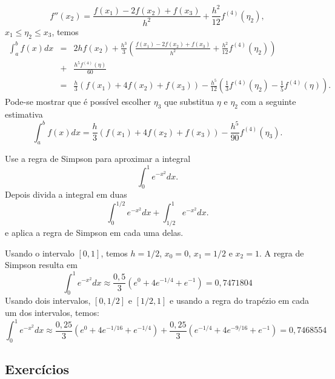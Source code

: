 $$
f''(x_2)=\frac{f(x_1)-2f(x_2)+f(x_3)}{h^2}+\frac{h^2}{12}f^{(4)}(\eta_2),
$$
$x_1\leq \eta_2\leq x_3$, temos
\begin{eqnarray*}
\int_a^bf(x)dx&=&2hf(x_2)+\frac{h^3}{3}\left(\frac{f(x_1)-2f(x_2)+f(x_3)}{h^2}+\frac{h^2}{12}f^{(4)}(\eta_2)\right)\\
&+&\frac{h^5f^{(4)}(\eta)}{60}\\
&=&\frac{h}{3}\left(f(x_1)+4f(x_2)+f(x_3)\right)-\frac{h^5}{12}\left(\frac{1}{3}f^{(4)}(\eta_2)-\frac{1}{5}f^{(4)}(\eta)\right).
\end{eqnarray*}
Pode-se mostrar que é possível escolher $\eta_3$ que substitua $\eta$ e $\eta_2$ com a seguinte estimativa
$$
\int_a^bf(x)dx=\frac{h}{3}\left(f(x_1)+4f(x_2)+f(x_3)\right)-\frac{h^5}{90}f^{(4)}(\eta_3).
$$

\begin{ex}
Use a regra de Simpson para aproximar a integral
$$
\int_0^1e^{-x^2}dx.
$$
Depois divida a integral em duas
$$
\int_0^{1/2}e^{-x^2}dx+\int_{1/2}^{1}e^{-x^2}dx.
$$
e aplica a regra de Simpson em cada uma delas.
\end{ex}
Usando o intervalo $[0,1]$, temos $h=1/2$, $x_0=0$, $x_1=1/2$ e $x_2=1$. A regra de Simpson resulta em
$$
\int_0^1e^{-x^2}dx\approx \frac{0,5}{3}(e^{0}+4e^{-1/4}+e^{-1})=0,7471804
$$
Usando dois intervalos, $[0,1/2]$ e $[1/2,1]$ e usando a regra do trapézio em cada um dos intervalos, temos:
$$
\int_0^1e^{-x^2}dx\approx \frac{0,25}{3}(e^{0}+4e^{-1/16}+e^{-1/4})+\frac{0,25}{3}(e^{-1/4}+4e^{-9/16}+e^{-1})=0,7468554
$$

\subsection*{Exercícios}

